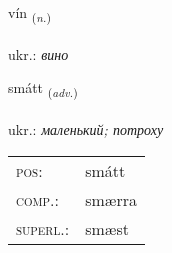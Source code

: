 \documentclass[frontgrid, backgrid]{flacards}\usepackage[]{graphicx}\usepackage[]{xcolor}
\begin{document}
\renewcommand{\flhead}{\vskip5pt \fboxsep=0pt {\small\bfseries\footnotesize Nafnorð | іменник}}
\renewcommand{\fcfoot}{\vskip5pt \fboxsep=0pt \hspace{2pt}{\small\bfseries\footnotesize 2K}}

\renewcommand{\blhead}{\vskip5pt {\small\bfseries\footnotesize Nafnorð | іменник }}
\renewcommand{\bcfoot}{\vskip5pt \hspace{2pt}{\small\bfseries\footnotesize 2K}}


{vín \small{\textsubscript{(\textit{n.})}} \\[1ex] %
\textphonetic{[viːn]} \\
ukr.: \emph{вино} \\  [2ex]
\renewcommand*{\arraystretch}{0.8}
}

\renewcommand{\flhead}{\vskip5pt \fboxsep=0pt {\small\bfseries\footnotesize Atviksorð | прислівник}}
\renewcommand{\fcfoot}{\vskip5pt \fboxsep=0pt \hspace{2pt}{\small\bfseries\footnotesize 2K}}

\renewcommand{\blhead}{\vskip5pt {\small\bfseries\footnotesize Atviksorð | прислівник }}
\renewcommand{\bcfoot}{\vskip5pt \hspace{2pt}{\small\bfseries\footnotesize 2K}}


{smátt \small{\textsubscript{(\textit{adv.})}} \\[1ex] %
\textphonetic{[smauht]} \\
ukr.: \emph{маленький; потроху} \\  [2ex]
\renewcommand*{\arraystretch}{0.8}
\begin{tabular}{ll}
\textsc{pos}: & smátt \\ 
\textsc{comp.}: & smærra \\ 
\textsc{superl.}: & smæst \\
\end{tabular}
}
\end{document}
